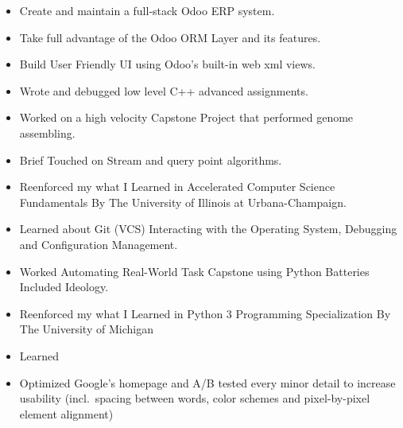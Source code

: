 \documentclass[10pt,a4paper,ragged2e,withhyper]{altacv}
\begin{document}
\begin{paracol}{2}


   \begin{itemize}
      \item Create and maintain a full-stack Odoo ERP system.
      \item Take full advantage of the Odoo ORM Layer and its features.
      \item Build User Friendly UI using Odoo's built-in web xml views.
   \end{itemize}

   \divider

   \begin{itemize}
      \item Wrote and debugged low level C++ advanced assignments.
      \item Worked on a high velocity Capstone Project that performed genome assembling. 
      \item Brief Touched on Stream and query point algorithms.
      \item Reenforced my what I Learned in Accelerated Computer Science Fundamentals By The University of Illinois at Urbana-Champaign.
   \end{itemize}

   \divider

   \begin{itemize}
      \item Learned about Git (VCS) Interacting with the Operating System, Debugging and Configuration Management. 
      \item Worked Automating Real-World Task Capstone using Python Batteries Included Ideology.
      \item Reenforced my what I Learned in Python 3 Programming Specialization By The University of Michigan
   \end{itemize}
   \divider


   \begin{itemize}
      \item Learned
      \item Optimized Google's homepage and A/B tested every minor detail to increase usability (incl.~spacing between words, color schemes and pixel-by-pixel element alignment)
   \end{itemize}


\end{paracol}
\end{document}
